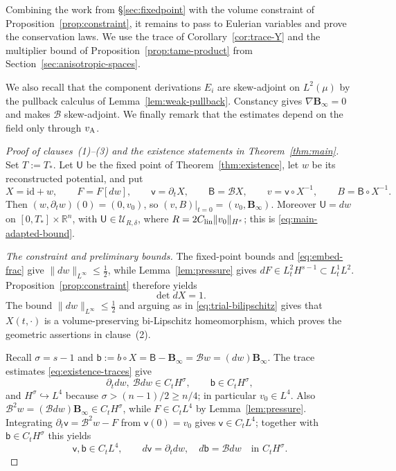 \documentclass[11pt,reqno]{amsart}
\theoremstyle{plain}
\theoremstyle{definition}
\theoremstyle{remark}
\numberwithin{equation}{section}
\newcommand{\Ufield}{\mathsf U}
\newcommand{\vLag}{\mathsf v}
\newcommand{\BLag}{\mathsf B}
\newcommand{\bLag}{\mathsf b}
\newcommand{\Binf}{\mathbf B_\infty}
\newcommand{\Real}{\mathbb R}
\newcommand{\Rn}{\Real^n}
\begin{document}
Combining the work from \S \ref{sec:fixedpoint} with the volume constraint of
Proposition~\ref{prop:constraint}, it remains to pass to Eulerian variables
and prove the conservation laws. We use the trace of
Corollary~\ref{cor:trace-Y} and the multiplier bound of
Proposition~\ref{prop:tame-product} from Section~\ref{sec:anisotropic-spaces}.

We also recall that the component derivations $E_i$ are skew-adjoint on $L^2(\mu)$ by the
pullback calculus of Lemma~\ref{lem:weak-pullback}.
Constancy gives $\nabla\Binf=0$ and makes $\mathcal B$ skew-adjoint. We finally remark that the
estimates depend on the field only through $v_{\rm A}$.


\begin{proof}[Proof of clauses~\textup{(1)}--\textup{(3)} and the existence
statements in Theorem~\ref{thm:main}]
Set $T:=T_*$. Let $\Ufield$ be the fixed point of Theorem~\ref{thm:existence}, let $w$ be its
reconstructed potential, and put
\[
 X=\mathrm{id}+w,\qquad F=F[dw],\qquad
 \vLag=\partial_tX,\qquad \BLag=\mathcal BX,\qquad
 v=\vLag\circ X^{-1},\qquad B=\BLag\circ X^{-1}.
\]
Then $(w,\partial_tw)(0)=(0,v_0)$, so
$(v,B)|_{t=0}=(v_0,\Binf)$.  Moreover
$\Ufield=dw$ on $[0,T_*]\times\Rn$, with
$\Ufield\in\mathcal U_{R,\delta}$, where
$R=2C_{\rm lin}\|v_0\|_{H^s}$; this is \eqref{eq:main-adapted-bound}.

\emph{The constraint and preliminary bounds.}
The fixed-point bounds and \eqref{eq:embed-frac} give
$\|dw\|_{L^\infty}\le\frac12$, while Lemma~\ref{lem:pressure} gives
$dF\in L^2_tH^{s-1}\subset L^1_tL^2$.  Proposition~\ref{prop:constraint}
therefore yields
\[
 \det dX=1.
\]
The bound $\|dw\|_{L^\infty}\le\frac12$ and arguing as in \eqref{eq:trial-bilipschitz} gives that
$X(t,\cdot)$ is a volume-preserving bi-Lipschitz homeomorphism, which proves
the geometric assertions in clause~(2).

Recall $\sigma=s-1$ and
$\bLag:=b\circ X=\BLag-\Binf=\mathcal Bw=(dw)\Binf$.
The trace estimates \eqref{eq:existence-traces} give
\begin{equation}\label{eq:preliminaryeulerian}
    \partial_tdw,\ \mathcal Bdw\in C_tH^\sigma,\qquad
 \bLag\in C_tH^\sigma,
\end{equation}
and $H^\sigma\hookrightarrow L^4$ because
$\sigma>(n-1)/2\ge n/4$; in particular $v_0\in L^4$.  Also
$\mathcal B^2w=(\mathcal Bdw)\Binf\in C_tH^\sigma$, while
$F\in C_tL^4$ by Lemma~\ref{lem:pressure}.  Integrating
$\partial_t\vLag=\mathcal B^2w-F$ from $\vLag(0)=v_0$ gives $\vLag\in C_tL^4$;
together with $\bLag\in C_tH^\sigma$ this yields
\begin{equation}\label{eq:return-preliminary}
 \vLag,\bLag\in C_tL^4,\qquad
 d\vLag=\partial_tdw,\quad d\bLag=\mathcal Bdw
 \quad\text{in }C_tH^\sigma.
\end{equation}


\end{proof}
\end{document}
